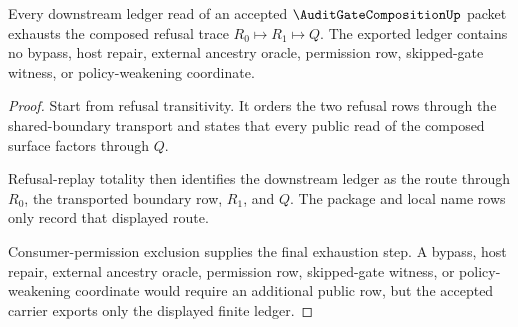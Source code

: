 \begin{theorem}
\label{thm:audit-gate-composition-downstream-ledger-exhaustion}
Every downstream ledger read of an accepted $\AuditGateCompositionUp$ packet
exhausts the composed refusal trace $R_0 \longmapsto R_1 \longmapsto Q$.
The exported ledger contains no bypass, host repair, external ancestry
oracle, permission row, skipped-gate witness, or policy-weakening coordinate.
\end{theorem}
\begin{proof}
Start from refusal transitivity. It orders the two refusal rows through the
shared-boundary transport and states that every public read of the composed
surface factors through $Q$.

Refusal-replay totality then identifies the downstream ledger as the route
through $R_0$, the transported boundary row, $R_1$, and $Q$. The package and
local name rows only record that displayed route.

Consumer-permission exclusion supplies the final exhaustion step. A bypass,
host repair, external ancestry oracle, permission row, skipped-gate witness,
or policy-weakening coordinate would require an additional public row, but
the accepted carrier exports only the displayed finite ledger.
\end{proof}

